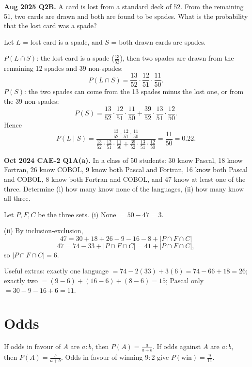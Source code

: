 \documentclass[11pt,a4paper]{article}
\begin{document}
\begin{pyqbox}
\textbf{Aug 2025 Q2B.} A card is lost from a standard deck of 52. From the remaining 51, two cards are drawn and both are found to be spades. What is the probability that the lost card was a spade?
\end{pyqbox}

\begin{solbox}
Let $L$ = lost card is a spade, and $S$ = both drawn cards are spades.

$P(L\cap S)$: the lost card is a spade ($\frac{13}{52}$), then two spades are drawn from the remaining 12 spades and 39 non-spades:
\[
P(L\cap S)=\frac{13}{52}\cdot\frac{12}{51}\cdot\frac{11}{50}.
\]
$P(S)$: the two spades can come from the 13 spades minus the lost one, or from the 39 non-spades:
\[
P(S)=\frac{13}{52}\cdot\frac{12}{51}\cdot\frac{11}{50}+\frac{39}{52}\cdot\frac{13}{51}\cdot\frac{12}{50}.
\]
Hence
\[
P(L\mid S)=\frac{\frac{13}{52}\cdot\frac{12}{51}\cdot\frac{11}{50}}{\frac{13}{52}\cdot\frac{12}{51}\cdot\frac{11}{50}+\frac{39}{52}\cdot\frac{13}{51}\cdot\frac{12}{50}}=\boxed{\frac{11}{50}}=0.22.
\]
\end{solbox}

\begin{pyqbox}
\textbf{Oct 2024 CAE-2 Q1A(a).} In a class of 50 students: 30 know Pascal, 18 know Fortran, 26 know COBOL, 9 know both Pascal and Fortran, 16 know both Pascal and COBOL, 8 know both Fortran and COBOL, and 47 know at least one of the three. Determine (i) how many know none of the languages, (ii) how many know all three.
\end{pyqbox}

\begin{solbox}
Let $P,F,C$ be the three sets. (i) None $=50-47=\boxed{3}$.

(ii) By inclusion-exclusion,
\[
47=30+18+26-9-16-8+|P\cap F\cap C|
\]
\[
47=74-33+|P\cap F\cap C|=41+|P\cap F\cap C|,
\]
so $|P\cap F\cap C|=\boxed{6}$.

Useful extras: exactly one language $=74-2(33)+3(6)=74-66+18=26$; exactly two $=(9-6)+(16-6)+(8-6)=15$; Pascal only $=30-9-16+6=11$.
\end{solbox}

\section{Odds}

If odds in favour of $A$ are $a:b$, then $P(A)=\frac{a}{a+b}$. If odds against $A$ are $a:b$, then $P(A)=\frac{b}{a+b}$. Odds in favour of winning $9:2$ give $P(\text{win})=\frac{9}{11}$.
\end{document}
